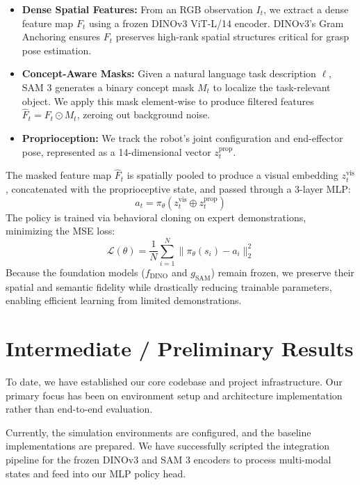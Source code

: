 \documentclass[conference]{IEEEtran}
\begin{document}
\begin{itemize}
    \item \textbf{Dense Spatial Features:} From an RGB observation $I_t$, we extract a dense feature map $F_t$ using a frozen DINOv3 ViT-L/14 encoder. DINOv3's Gram Anchoring ensures $F_t$ preserves high-rank spatial structures critical for grasp pose estimation.
    \item \textbf{Concept-Aware Masks:} Given a natural language task description $\ell$, SAM 3 generates a binary concept mask $M_t$ to localize the task-relevant object. We apply this mask element-wise to produce filtered features $\hat{F}_t = F_t \odot M_t$, zeroing out background noise.
    \item \textbf{Proprioception:} We track the robot's joint configuration and end-effector pose, represented as a 14-dimensional vector $z_t^{\text{prop}}$.
\end{itemize}

The masked feature map $\hat{F}_t$ is spatially pooled to produce a visual embedding $z_t^{\text{vis}}$, concatenated with the proprioceptive state, and passed through a 3-layer MLP:
\begin{equation}
    a_t = \pi_\theta(z_t^{\text{vis}} \oplus z_t^{\text{prop}})
\end{equation}
The policy is trained via behavioral cloning on expert demonstrations, minimizing the MSE loss:
\begin{equation}
    \mathcal{L}(\theta) = \frac{1}{N} \sum_{i=1}^{N} \|\pi_\theta(s_i) - a_i\|_2^2
\end{equation}
Because the foundation models ($f_{\text{DINO}}$ and $g_{\text{SAM}}$) remain frozen, we preserve their spatial and semantic fidelity while drastically reducing trainable parameters, enabling efficient learning from limited demonstrations.

\section{Intermediate / Preliminary Results}
To date, we have established our core codebase and project infrastructure. Our primary focus has been on environment setup and architecture implementation rather than end-to-end evaluation. 

Currently, the simulation environments are configured, and the baseline implementations are prepared. We have successfully scripted the integration pipeline for the frozen DINOv3 and SAM 3 encoders to process multi-modal states and feed into our MLP policy head. 
\end{document}
